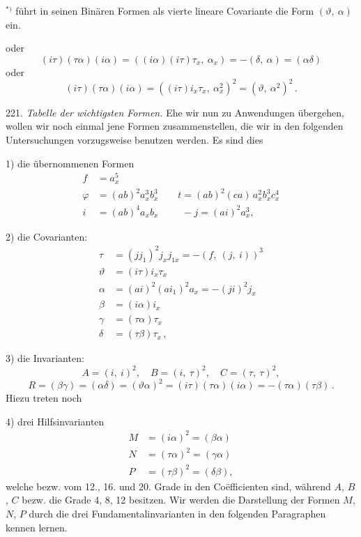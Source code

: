 \documentclass[11pt]{article}
\providecommand{\gesperrt}[1]{\textls[130]{#1}}
\providecommand{\weberpage}[1]{}
\providecommand{\weq}[2]{\begin{equation}\tag{#1}#2\end{equation}}
\begin{document}
${}^{*)}$ \gesperrt{Clebsch} f\"uhrt in seinen \glqq Bin\"aren Formen\grqq{} als vierte lineare Covariante die Form $(\vartheta,\ \alpha)$ ein.


\weberpage{247}
oder
\weq{7}{(i\tau)(\tau\alpha)(i\alpha) = ((i\alpha)(i\tau)\tau_x,\ \alpha_x) = -(\delta,\ \alpha) = (\alpha\delta)}
oder
\weq{8}{(i\tau)(\tau\alpha)(i\alpha) = ((i\tau)i_x\tau_x,\ \alpha_x^2)^2 = (\vartheta,\ \alpha^2)^2\,.}

221. \textit{Tabelle der wichtigsten Formen.} Ehe wir nun zu Anwendungen \"ubergehen, wollen wir noch einmal jene Formen zusammenstellen, die wir in den folgenden Untersuchungen vorzugsweise benutzen werden. Es sind dies

1) die \"ubernommenen Formen
\[
\begin{aligned}
f &= a_x^5 \\
\varphi &= (ab)^2 a_x^3 b_x^3 \qquad t = (ab)^2(ca)\,a_x^2 b_x^3 c_x^4 \\
i &= (ab)^4 a_x b_x \qquad\ \ -j = (ai)^2 a_x^3,
\end{aligned}
\]

2) die Covarianten:
\[
\begin{aligned}
\tau &= (jj_1)^2 j_x j_{1x} = -(f,\ (j,\ i))^3 \\
\vartheta &= (i\tau)i_x\tau_x \\
\alpha &= (ai)^2(ai_1)^2 a_x = -(ji)^2 j_x \\
\beta &= (i\alpha)i_x \\
\gamma &= (\tau\alpha)\tau_x \\
\delta &= (\tau\beta)\tau_x\,,
\end{aligned}
\]

3) die Invarianten:
\[
A = (i,\ i)^2,\quad B = (i,\ \tau)^2,\quad C = (\tau,\ \tau)^2,
\]
\[
R = (\beta\gamma) = (\alpha\delta) = (\vartheta\alpha)^2 = (i\tau)(\tau\alpha)(i\alpha) = -(\tau\alpha)(\tau\beta)\,.
\]
Hiezu treten noch

4) drei Hilfsinvarianten
\[
\begin{aligned}
M &= (i\alpha)^2 = (\beta\alpha) \\
N &= (\tau\alpha)^2 = (\gamma\alpha) \\
P &= (\tau\beta)^2 = (\delta\beta),
\end{aligned}
\]
welche bezw. vom 12., 16. und 20. Grade in den Co\"efficienten sind, w\"ahrend $A$, $B$, $C$ bezw. die Grade 4, 8, 12 besitzen. Wir werden die Darstellung der Formen $M$, $N$, $P$ durch die drei Fundamentalinvarianten in den folgenden Paragraphen kennen lernen.
\end{document}

